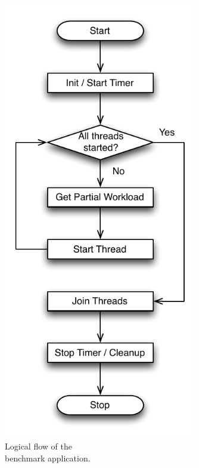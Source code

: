 \vspace*{1cm}

\begin{figure}[h!]
    \centering
\begin{minipage}[c]{0.45\linewidth}
    \includegraphics[width=0.75\textwidth]{figures/bench/host}
    \caption{Logical flow of the\\benchmark application.}
    \label{fig:eval-host}
\end{minipage}
\begin{minipage}[c]{0.45\linewidth}

\end{minipage}
\end{figure}
